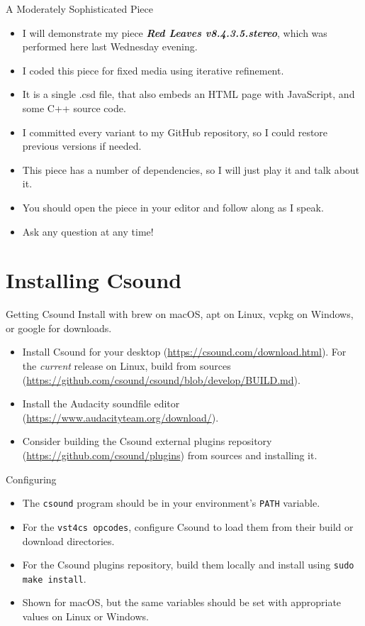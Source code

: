 \documentclass{beamer}
\begin{document}
\begin{frame}{A Moderately Sophisticated Piece}
\begin{itemize}
\item I will demonstrate my piece \emph{\textbf{Red Leaves v8.4.3.5.stereo}}, which was performed here last Wednesday evening.
\item I coded this piece for fixed media using iterative refinement.
\item It is a single .csd file, that also embeds an HTML page with JavaScript, and some C++ source code.
\item I committed every variant to my GitHub repository, so I could restore previous versions if needed.
\item This piece has a number of dependencies, so I will just play it and talk about it. 
\item You should open the piece in your editor and follow along as I speak. 
\item Ask any question at any time!
\end{itemize}
\end{frame}

\section{Installing Csound}
\begin{frame}{Getting Csound}
Install with brew on macOS, apt on Linux, vcpkg on Windows, or 
google for downloads.
\begin{itemize}
\item Install Csound for your desktop (\url{https://csound.com/download.html}). For the \emph{current} release on
Linux, build from sources
(\url{https://github.com/csound/csound/blob/develop/BUILD.md}).
\item Install the Audacity soundfile editor (\url{https://www.audacityteam.org/download/}).
\item Consider building the Csound external plugins repository (\url{https://github.com/csound/plugins}) from sources and installing it.
\end{itemize}
\end{frame}

\begin{frame}{Configuring}
\begin{itemize}
\item The \texttt{csound} program should be in your environment's \texttt{PATH} variable.
\item For the \texttt{vst4cs opcodes}, configure Csound to load them from their build or download directories.
\item For the Csound plugins repository, build them locally and install using \texttt{sudo make install}.
\item Shown for macOS, but the same variables should be set with appropriate values on Linux or Windows.
\end{itemize}
\end{frame}
\end{document}
